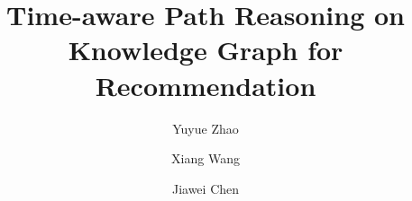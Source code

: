 \documentclass[acmsmall]{acmart}
\begin{document}
\title{Time-aware Path Reasoning on Knowledge Graph for Recommendation}

\newcommand\norm[1]{\left\lVert#1\right\rVert}
\newcommand{\Lapl}{\mathbf{\mathop{\mathcal{L}}}}
\newcommand{\lapl}{\mathcal{L}}
\newcommand{\Trans}[1]{{#1}^{\top}}
\newcommand{\Trace}[1]{tr\left({#1}\right)}
\newcommand{\Bracs}[1]{\left({#1}\right)}
\newcommand{\Mat}[1]{\textbf{#1}}
\newcommand{\MatS}[3]{\mathbf{#1}^{#2}_{#3}}
\newcommand{\Space}[1]{\mathbb{#1}}
\newcommand{\Set}[1]{\mathcal{#1}}
\newcommand{\vectornorm}[1]{\left|\left|#1\right|\right|}
\newcommand{\bpi}{\boldsymbol{\pi}}
\newcommand{\BlockMat}[2]{\left[\begin{matrix}#1\\#2\end{matrix}\right]}
\newcommand{\BlockMatSquare}[4]{\left[\begin{matrix}#1 & #2\\#3 & #4\end{matrix}\right]}
\newcommand{\ParaTitle}[1]{\noindent\textbf{#1}}
\newcommand\at[2]{\left.#1\right|_{#2}}

\newcommand{\ie}{{\em i.e.}}
\newcommand{\eg}{{\em e.g.}}
\newcommand{\etal}{{\em et al.}}
\newcommand{\etc}{{\em etc.}}
\newcommand{\tkgrec}{TPRec}





\author{Yuyue Zhao}


\author{Xiang Wang}
  
\author{Jiawei Chen}
  
\end{document}
